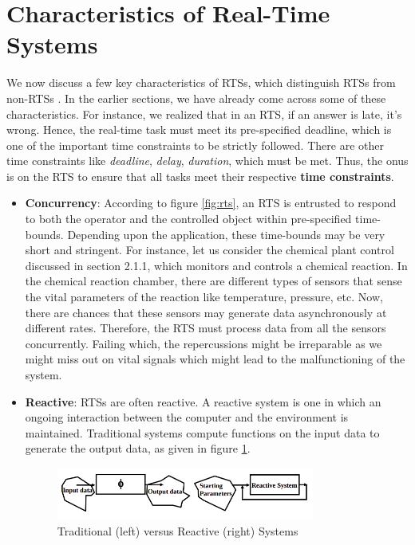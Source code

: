 \documentclass[12pt]{report}
\begin{document}
\section{Characteristics of Real-Time Systems}
We now discuss a few key characteristics of RTSs, which distinguish RTSs from non-RTSs \cite{NPTEL}. In the earlier sections, we have already come across some of these characteristics. For instance, we realized that in an RTS, if an answer is late, it's wrong. Hence, the real-time task must meet its pre-specified deadline, which is one of the important time constraints to be strictly followed. There are other time constraints like  \emph{deadline}, \emph{delay}, \emph{duration}, which must be met. Thus, the onus is on the RTS to ensure that all tasks meet their respective \textbf{time constraints}.   
\begin{itemize}
    \item \textbf{Concurrency}: According to figure \ref{fig:rts}, an RTS is entrusted to respond to both the operator and the controlled object within pre-specified time-bounds. Depending upon the application, these time-bounds may be very short and stringent.  For instance, let us consider the chemical plant control discussed in section 2.1.1, which monitors and controls a chemical reaction. In the chemical reaction chamber, there are different types of sensors that sense the vital parameters of the reaction like temperature, pressure, etc. Now, there are chances that these sensors may generate data asynchronously at different rates. Therefore, the RTS must process data from all the sensors concurrently. Failing which, the repercussions might be irreparable as we might miss out on vital signals which might lead to the malfunctioning of the system.
    
    \item \textbf{Reactive}: RTSs are often reactive. A reactive system is one in which an ongoing interaction between the computer and the environment is maintained. Traditional systems compute functions on the input data to generate the output data, as given in figure \ref{fig:trad-reac}.
    \begin{figure}[h]
    \centering
    \includegraphics[width=0.8\textwidth]{images/trad-vs-reac.png}
    \caption[Traditional (left) versus Reactive (right) Systems]{Traditional (left) versus Reactive (right) Systems \cite{NPTEL}}
    \label{fig:trad-reac}
    \end{figure}
    

\end{itemize}
\end{document}
